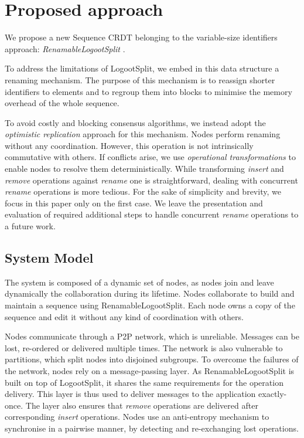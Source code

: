\documentclass[sigplan,10pt]{acmart}
\begin{document}
\section{Proposed approach}
\label{sec:proposition}

We propose a new Sequence \ac{CRDT} belonging to the variable-size identifiers approach: \emph{RenamableLogootSplit} \cite{nicolas:hal-01932552}.

To address the limitations of LogootSplit, we embed in this data structure a renaming mechanism.
The purpose of this mechanism is to reassign shorter identifiers to elements and to regroup them into blocks to minimise the memory overhead of the whole sequence.

To avoid costly and blocking consensus algorithms, we instead adopt the \emph{optimistic replication} approach for this mechanism.
Nodes perform renaming without any coordination.
However, this operation is not intrinsically commutative with others.
If conflicts arise, we use \emph{operational transformations} to enable nodes to resolve them deterministically.
While transforming \emph{insert} and \emph{remove} operations against \emph{rename} one is straightforward, dealing with concurrent \emph{rename} operations is more tedious.
For the sake of simplicity and brevity, we focus in this paper only on the first case.
We leave the presentation and evaluation of required additional steps to handle concurrent \emph{rename} operations to a future work.

\subsection{System Model}

The system is composed of a dynamic set of nodes, as nodes join and leave dynamically the collaboration during its lifetime.
Nodes collaborate to build and maintain a sequence using RenamableLogootSplit.
Each node owns a copy of the sequence and edit it without any kind of coordination with others.

Nodes communicate through a \ac{P2P} network, which is unreliable.
Messages can be lost, re-ordered or delivered multiple times.
The network is also vulnerable to partitions, which split nodes into disjoined subgroups.
To overcome the failures of the network, nodes rely on a message-passing layer.
As RenamableLogootSplit is built on top of LogootSplit, it shares the same requirements for the operation delivery.
This layer is thus used to deliver messages to the application exactly-once.
The layer also ensures that \emph{remove} operations are delivered after corresponding \emph{insert} operations.
Nodes use an anti-entropy mechanism to synchronise in a pairwise manner, by detecting and re-exchanging lost operations.
\end{document}
